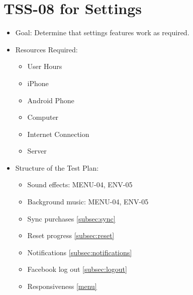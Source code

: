 \section{TSS-08 for Settings}
\begin{itemize}
\item Goal: Determine that settings features work as required.

\item Resources Required: 
\begin{itemize}
\item User Hours 
\item iPhone 
\item Android Phone 
\item Computer 
\item Internet Connection 
\item Server
\end{itemize}

\item Structure of the Test Plan: 
\begin{itemize}
\item Sound effects: MENU-04, ENV-05
\item Background music: MENU-04, ENV-05
\item Sync purchases \ref{subsec:sync}
\item Reset progress  \ref{subsec:reset}
\item Notifications  \ref{subsec:notifications}
\item Facebook log out  \ref{subsec:logout}
\item Responsiveness \ref{menu}
\end{itemize}
\end{itemize}

